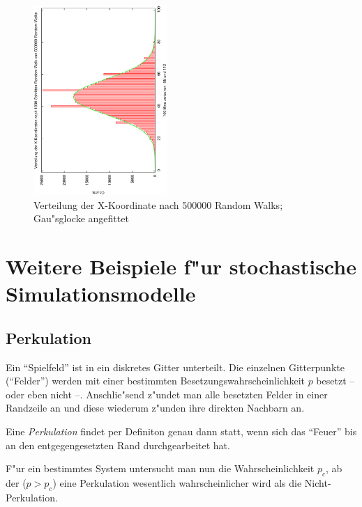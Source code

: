 \documentclass[a4paper]{book}
\begin{document}
\begin{figure}
  \centering
  \includegraphics[angle=-90,width=0.45\textwidth]{bilder/randoms-500000.histo.eps}
  \caption{Verteilung der X-Koordinate nach 500000 Random Walks;
    Gau"sglocke angefittet}
  \label{fig:distrrandomw500000}
\end{figure}




\section{Weitere Beispiele f"ur stochastische Simulationsmodelle}
\label{sec:weit_beisp_fur_stoch_simul}





\subsection{Perkulation}
\label{sec:perkulation}


Ein "`Spielfeld"' ist in ein diskretes Gitter unterteilt. Die
einzelnen Gitterpunkte ("`Felder"') werden mit einer bestimmten
Besetzungswahrscheinlichkeit $p$ besetzt -- oder eben nicht
--. Anschlie"send z"undet man alle besetzten Felder in einer Randzeile
an und diese wiederum z"unden ihre direkten Nachbarn an. 

Eine \emph{Perkulation} findet per Definiton genau dann statt, wenn
sich das "`Feuer"' bis an den entgegengesetzten Rand durchgearbeitet
hat.

F"ur ein bestimmtes System untersucht man nun die Wahrscheinlichkeit
$p_c$, ab der ($p > p_c$) eine Perkulation wesentlich wahrscheinlicher
wird als die Nicht-Perkulation.
\end{document}
